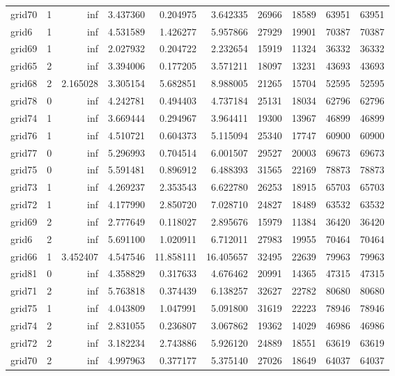 \begin{longtable}{|l|r|r|r|r|r|r|r|r|r|}
grid70 & 1 & inf & 3.437360 & 0.204975 & 3.642335 & 26966 & 18589 & 63951 & 63951 \\
grid6 & 1 & inf & 4.531589 & 1.426277 & 5.957866 & 27929 & 19901 & 70387 & 70387 \\
grid69 & 1 & inf & 2.027932 & 0.204722 & 2.232654 & 15919 & 11324 & 36332 & 36332 \\
grid65 & 2 & inf & 3.394006 & 0.177205 & 3.571211 & 18097 & 13231 & 43693 & 43693 \\
grid68 & 2 & 2.165028 & 3.305154 & 5.682851 & 8.988005 & 21265 & 15704 & 52595 & 52595 \\
grid78 & 0 & inf & 4.242781 & 0.494403 & 4.737184 & 25131 & 18034 & 62796 & 62796 \\
grid74 & 1 & inf & 3.669444 & 0.294967 & 3.964411 & 19300 & 13967 & 46899 & 46899 \\
grid76 & 1 & inf & 4.510721 & 0.604373 & 5.115094 & 25340 & 17747 & 60900 & 60900 \\
grid77 & 0 & inf & 5.296993 & 0.704514 & 6.001507 & 29527 & 20003 & 69673 & 69673 \\
grid75 & 0 & inf & 5.591481 & 0.896912 & 6.488393 & 31565 & 22169 & 78873 & 78873 \\
grid73 & 1 & inf & 4.269237 & 2.353543 & 6.622780 & 26253 & 18915 & 65703 & 65703 \\
grid72 & 1 & inf & 4.177990 & 2.850720 & 7.028710 & 24827 & 18489 & 63532 & 63532 \\
grid69 & 2 & inf & 2.777649 & 0.118027 & 2.895676 & 15979 & 11384 & 36420 & 36420 \\
grid6 & 2 & inf & 5.691100 & 1.020911 & 6.712011 & 27983 & 19955 & 70464 & 70464 \\
grid66 & 1 & 3.452407 & 4.547546 & 11.858111 & 16.405657 & 32495 & 22639 & 79963 & 79963 \\
grid81 & 0 & inf & 4.358829 & 0.317633 & 4.676462 & 20991 & 14365 & 47315 & 47315 \\
grid71 & 2 & inf & 5.763818 & 0.374439 & 6.138257 & 32627 & 22782 & 80680 & 80680 \\
grid75 & 1 & inf & 4.043809 & 1.047991 & 5.091800 & 31619 & 22223 & 78946 & 78946 \\
grid74 & 2 & inf & 2.831055 & 0.236807 & 3.067862 & 19362 & 14029 & 46986 & 46986 \\
grid72 & 2 & inf & 3.182234 & 2.743886 & 5.926120 & 24889 & 18551 & 63619 & 63619 \\
grid70 & 2 & inf & 4.997963 & 0.377177 & 5.375140 & 27026 & 18649 & 64037 & 64037 \\

\end{longtable}
